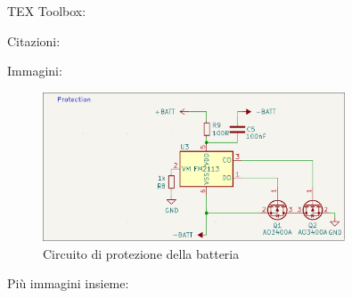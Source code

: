 TEX Toolbox: 

Citazioni:

\cite{riscv}

Immagini:

\begin{figure}[H]
  \centering
  \includegraphics[width=0.8\textwidth]{images/chapter2/protection.png}
  \caption{Circuito di protezione della batteria}
  \label{fig:protection}
\end{figure}

Più immagini insieme:

